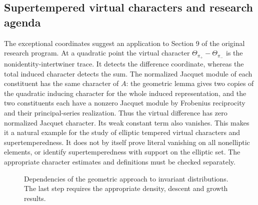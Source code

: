 \subsection{Supertempered virtual characters and research agenda}\label{subsec:geometry-agenda}
The exceptional coordinates suggest an application to Section 9 of the original research program. At a quadratic point the virtual character $\Theta_{\pi_+}-\Theta_{\pi_-}$ is the nonidentity-intertwiner trace. It detects the difference coordinate, whereas the total induced character detects the sum. The normalized Jacquet module of each constituent has the same character of $A$: the geometric lemma gives two copies of the quadratic inducing character for the whole induced representation, and the two constituents each have a nonzero Jacquet module by Frobenius reciprocity and their principal-series realization. Thus the virtual difference has zero normalized Jacquet character. Its weak constant term also vanishes. This makes it a natural example for the study of elliptic tempered virtual characters and supertemperedness. It does not by itself prove literal vanishing on all nonelliptic elements, or identify supertemperedness with support on the elliptic set. The appropriate character estimates and definitions must be checked separately.
\begin{figure}[htbp]\centering
{}
\caption{Dependencies of the geometric approach to invariant distributions. The last step requires the appropriate density, descent and growth results.}\label{fig:geometry-dependencies}
\end{figure}


